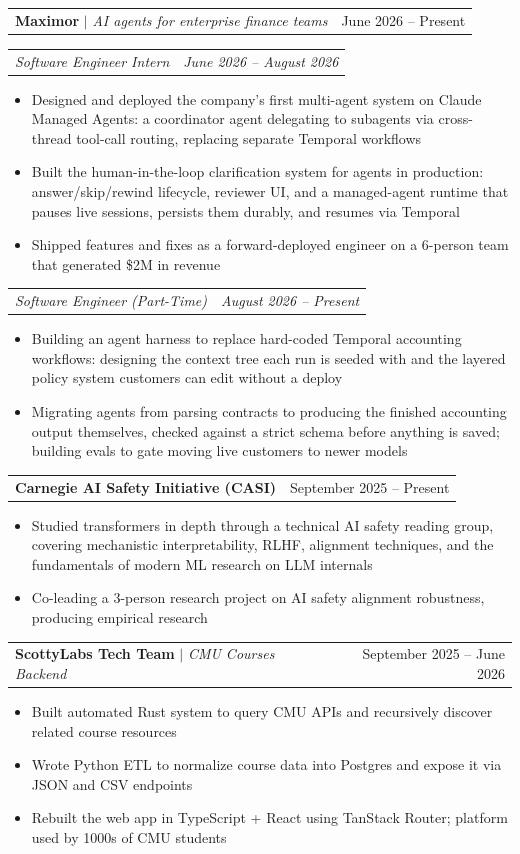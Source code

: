 \documentclass[letterpaper,11pt]{article}
\makeatletter
\newcommand{\resumeItem}[1]{
  \item\small{
    {#1 \vspace{-2pt}}
  }
}
\newcommand{\resumeSubSubheading}[2]{
    \item
    \begin{tabular*}{0.97\textwidth}{l@{\extracolsep{\fill}}r}
      \textit{\small#1} & \textit{\small #2} \\
    \end{tabular*}\vspace{-7pt}
}
\newcommand{\resumeProjectHeading}[2]{
    \item
    \begin{tabular*}{0.97\textwidth}{l@{\extracolsep{\fill}}r}
      \small#1 & #2 \\
    \end{tabular*}\vspace{-7pt}
}
\newcommand{\resumeItemListStart}{\begin{itemize}[itemsep=0pt]}
\newcommand{\resumeItemListEnd}{\end{itemize}\vspace{-5pt}}
\makeatother
\begin{document}
      \resumeProjectHeading
          {\textbf{Maximor} $|$ \emph{AI agents for enterprise finance teams}}{June 2026 -- Present}
      \resumeSubSubheading
          {Software Engineer Intern}{June 2026 -- August 2026}
          \resumeItemListStart
            \resumeItem{Designed and deployed the company's first multi-agent system on Claude Managed Agents: a coordinator agent delegating to subagents via cross-thread tool-call routing, replacing separate Temporal workflows}
            \resumeItem{Built the human-in-the-loop clarification system for agents in production: answer/skip/rewind lifecycle, reviewer UI, and a managed-agent runtime that pauses live sessions, persists them durably, and resumes via Temporal}
            \resumeItem{Shipped features and fixes as a forward-deployed engineer on a 6-person team that generated \$2M in revenue}
          \resumeItemListEnd
      \resumeSubSubheading
          {Software Engineer (Part-Time)}{August 2026 -- Present}
          \resumeItemListStart
            \resumeItem{Building an agent harness to replace hard-coded Temporal accounting workflows: designing the context tree each run is seeded with and the layered policy system customers can edit without a deploy}
            \resumeItem{Migrating agents from parsing contracts to producing the finished accounting output themselves, checked against a strict schema before anything is saved; building evals to gate moving live customers to newer models}
          \resumeItemListEnd

      \resumeProjectHeading
          {\textbf{Carnegie AI Safety Initiative (CASI)}}{September 2025 -- Present}
          \resumeItemListStart
            \resumeItem{Studied transformers in depth through a technical AI safety reading group, covering mechanistic interpretability, RLHF, alignment techniques, and the fundamentals of modern ML research on LLM internals}
            \resumeItem{Co-leading a 3-person research project on AI safety alignment robustness, producing empirical research}
          \resumeItemListEnd

      \resumeProjectHeading
          {\textbf{ScottyLabs Tech Team} $|$ \emph{CMU Courses Backend}}{September 2025 -- June 2026}
          \resumeItemListStart
            \resumeItem{Built automated Rust system to query CMU APIs and recursively discover related course resources}
            \resumeItem{Wrote Python ETL to normalize course data into Postgres and expose it via JSON and CSV endpoints}
            \resumeItem{Rebuilt the web app in TypeScript + React using TanStack Router; platform used by 1000s of CMU students}
          \resumeItemListEnd
\end{document}
